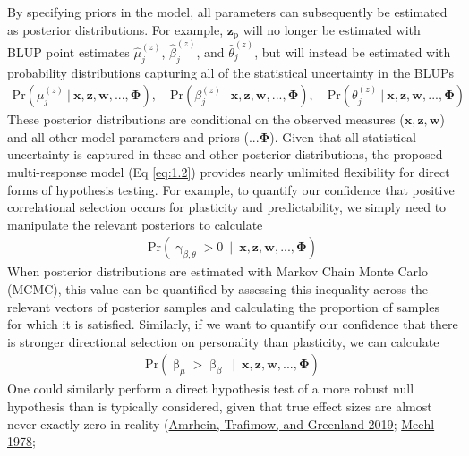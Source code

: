 \documentclass{article}
\begin{document}
By specifying priors in the model, all parameters can subsequently be
estimated as posterior distributions. For example,
\(\boldsymbol{z}_{\boldsymbol{\mathrm{p}}}\) will no longer be estimated
with BLUP point estimates \(\hat{\mu}_j^{(z)}\),
\(\hat{\beta}_j^{(z)}\), and \(\hat{\theta}_j^{(z)}\), but will instead
be estimated with probability distributions capturing all of the
statistical uncertainty in the BLUPs \begin{align*}
\mathrm{Pr}\left( \mu_j^{(z)} \ | \ \boldsymbol{x},\boldsymbol{z},\boldsymbol{w},...,\boldsymbol{\Phi} \right), \quad
\mathrm{Pr}\left( \beta_j^{(z)} \ | \ \boldsymbol{x},\boldsymbol{z},\boldsymbol{w},...,\boldsymbol{\Phi} \right), \quad
\mathrm{Pr}\left( \theta_j^{(z)} \ | \ \boldsymbol{x},\boldsymbol{z},\boldsymbol{w},...,\boldsymbol{\Phi} \right)
\end{align*} These posterior distributions are conditional on the
observed measures (\(\boldsymbol{x},\boldsymbol{z},\boldsymbol{w}\)) and
all other model parameters and priors (\(...\boldsymbol{\Phi}\)). Given
that all statistical uncertainty is captured in these and other
posterior distributions, the proposed multi-response model (Eq
\ref{eq:1.2}) provides nearly unlimited flexibility for direct forms of
hypothesis testing. For example, to quantify our confidence that
positive correlational selection occurs for plasticity and
predictability, we simply need to manipulate the relevant posteriors to
calculate \begin{align*}
\mathrm{Pr}\left( \upgamma _ {\beta , \theta}  > 0 \ \mid \ \boldsymbol{x},\boldsymbol{z},\boldsymbol{w},...,\boldsymbol{\Phi} \right)
\end{align*} When posterior distributions are estimated with Markov
Chain Monte Carlo (MCMC), this value can be quantified by assessing this
inequality across the relevant vectors of posterior samples and
calculating the proportion of samples for which it is satisfied.
Similarly, if we want to quantify our confidence that there is stronger
directional selection on personality than plasticity, we can calculate
\begin{align*}
\mathrm{Pr}\left( \upbeta _ \mu  >  \upbeta _ \beta \ \mid \ \boldsymbol{x},\boldsymbol{z},\boldsymbol{w},...,\boldsymbol{\Phi} \right)
\end{align*} One could similarly perform a direct hypothesis test of a
more robust null hypothesis than is typically considered, given that
true effect sizes are almost never exactly zero in reality
(\protect\hyperlink{ref-Amrhein2019}{Amrhein, Trafimow, and Greenland
2019}; \protect\hyperlink{ref-Meehl1978}{Meehl 1978};
\end{document}
